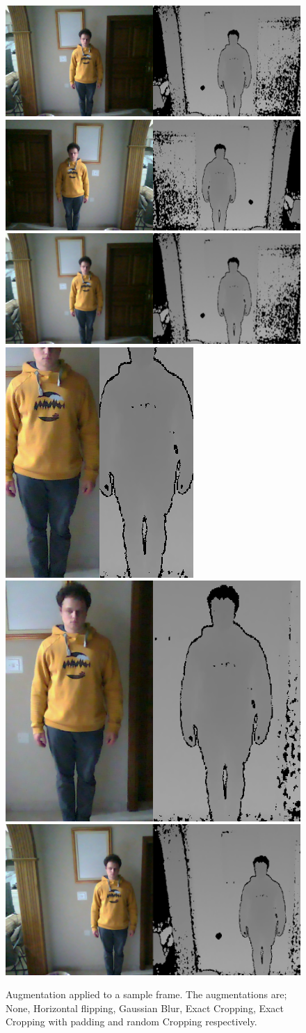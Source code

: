 \begin{figure}
    \includegraphics[width=.33\textwidth]{figures/Model/Augmentation/Original.png}\hfill
    \includegraphics[width=.33\textwidth]{figures/Model/Augmentation/Flipped.png}\hfill
    \includegraphics[width=.33\textwidth]{figures/Model/Augmentation/GaussianBlur.png}
    \\[\smallskipamount]
    \includegraphics[width=.33\textwidth]{figures/Model/Augmentation/Cropped.png}\hfill
    \includegraphics[width=.33\textwidth]{figures/Model/Augmentation/CroppedPad50.png}\hfill
    \includegraphics[width=.33\textwidth]{figures/Model/Augmentation/RandomCropped.png}
    \caption[Data Augmentation]{Augmentation applied to a sample frame. The augmentations are; None, Horizontal flipping, Gaussian Blur, Exact Cropping, Exact Cropping with padding and random Cropping respectively.}\label{fig:augmentation}
\end{figure}


